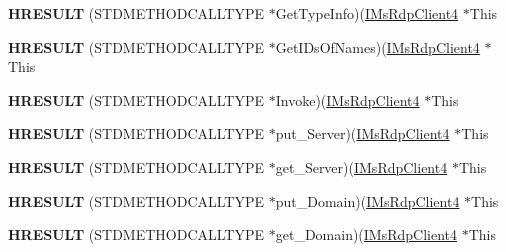 \begin{DoxyCompactItemize}
{\bfseries H\+R\+E\+S\+U\+LT} (S\+T\+D\+M\+E\+T\+H\+O\+D\+C\+A\+L\+L\+T\+Y\+PE $\ast$Get\+Type\+Info)(\hyperlink{interface_m_s_t_s_c_lib_1_1_i_ms_rdp_client4}{I\+Ms\+Rdp\+Client4} $\ast$This
\item 
\mbox{\label{struct_m_s_t_s_c_lib_1_1_i_ms_rdp_client4_vtbl_a31688bbd325790a5f6daf4d9e4fde34e}} 
{\bfseries H\+R\+E\+S\+U\+LT} (S\+T\+D\+M\+E\+T\+H\+O\+D\+C\+A\+L\+L\+T\+Y\+PE $\ast$Get\+I\+Ds\+Of\+Names)(\hyperlink{interface_m_s_t_s_c_lib_1_1_i_ms_rdp_client4}{I\+Ms\+Rdp\+Client4} $\ast$This
\item 
\mbox{\label{struct_m_s_t_s_c_lib_1_1_i_ms_rdp_client4_vtbl_a61a851d602e5c493a392583ce543d932}} 
{\bfseries H\+R\+E\+S\+U\+LT} (S\+T\+D\+M\+E\+T\+H\+O\+D\+C\+A\+L\+L\+T\+Y\+PE $\ast$Invoke)(\hyperlink{interface_m_s_t_s_c_lib_1_1_i_ms_rdp_client4}{I\+Ms\+Rdp\+Client4} $\ast$This
\item 
\mbox{\label{struct_m_s_t_s_c_lib_1_1_i_ms_rdp_client4_vtbl_ac90c0fdebbba04a0ea0ea8732ead8f66}} 
{\bfseries H\+R\+E\+S\+U\+LT} (S\+T\+D\+M\+E\+T\+H\+O\+D\+C\+A\+L\+L\+T\+Y\+PE $\ast$put\+\_\+\+Server)(\hyperlink{interface_m_s_t_s_c_lib_1_1_i_ms_rdp_client4}{I\+Ms\+Rdp\+Client4} $\ast$This
\item 
\mbox{\label{struct_m_s_t_s_c_lib_1_1_i_ms_rdp_client4_vtbl_a9a93583352cce56f173e4d7e9fda5cd5}} 
{\bfseries H\+R\+E\+S\+U\+LT} (S\+T\+D\+M\+E\+T\+H\+O\+D\+C\+A\+L\+L\+T\+Y\+PE $\ast$get\+\_\+\+Server)(\hyperlink{interface_m_s_t_s_c_lib_1_1_i_ms_rdp_client4}{I\+Ms\+Rdp\+Client4} $\ast$This
\item 
\mbox{\label{struct_m_s_t_s_c_lib_1_1_i_ms_rdp_client4_vtbl_a95b838595a851cc596e9928aa231bf04}} 
{\bfseries H\+R\+E\+S\+U\+LT} (S\+T\+D\+M\+E\+T\+H\+O\+D\+C\+A\+L\+L\+T\+Y\+PE $\ast$put\+\_\+\+Domain)(\hyperlink{interface_m_s_t_s_c_lib_1_1_i_ms_rdp_client4}{I\+Ms\+Rdp\+Client4} $\ast$This
\item 
\mbox{\label{struct_m_s_t_s_c_lib_1_1_i_ms_rdp_client4_vtbl_a84a2f42877dba9357e966c7eca096bd3}} 
{\bfseries H\+R\+E\+S\+U\+LT} (S\+T\+D\+M\+E\+T\+H\+O\+D\+C\+A\+L\+L\+T\+Y\+PE $\ast$get\+\_\+\+Domain)(\hyperlink{interface_m_s_t_s_c_lib_1_1_i_ms_rdp_client4}{I\+Ms\+Rdp\+Client4} $\ast$This

\end{DoxyCompactItemize}
